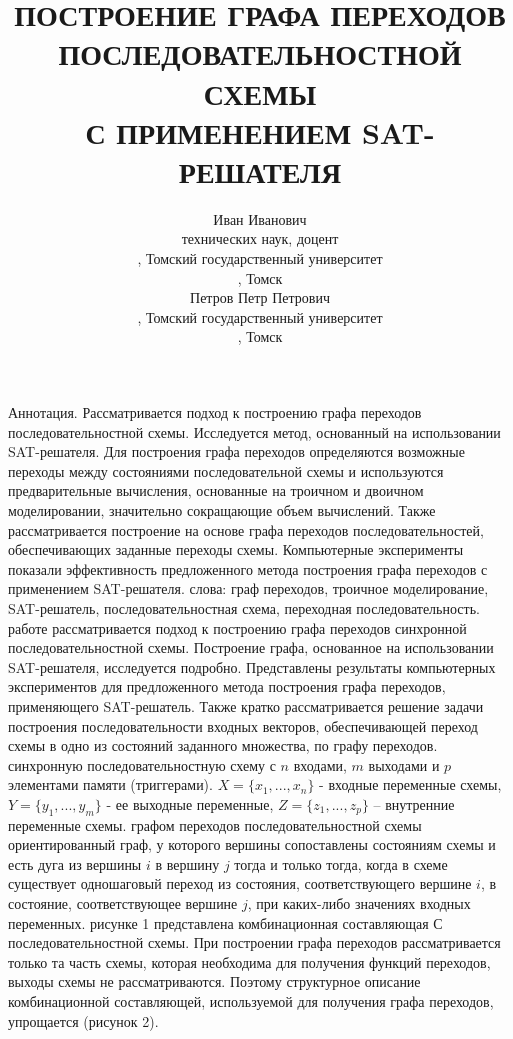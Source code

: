 \documentclass[13pt]{article}
\title{ПОСТРОЕНИЕ ГРАФА ПЕРЕХОДОВ ПОСЛЕДОВАТЕЛЬНОСТНОЙ СХЕМЫ\\ С ПРИМЕНЕНИЕМ SAT-РЕШАТЕЛЯ}
\author{\LARGEИванов Иван Иванович \\
\LARGEкандидат технических наук, доцент \\
\LARGEдоцент, Томский государственный университет \\
\LARGEРоссия, Томск \\ Петров Петр Петрович \\
\LARGEстудент, Томский государственный университет \\
\LARGEРоссия, Томск}
\begin{document}
\maketitle
\begin{Large}
Аннотация. Рассматривается подход к построению графа
переходов последовательностной схемы. Исследуется метод,
основанный на использовании SAT-решателя. Для построения графа
переходов определяются возможные переходы между состояниями
последовательной схемы и используются предварительные
вычисления, основанные на троичном и двоичном моделировании,
значительно сокращающие объем вычислений. Также
рассматривается построение на основе графа переходов
последовательностей, обеспечивающих заданные переходы схемы.
Компьютерные эксперименты показали эффективность
предложенного метода построения графа переходов с применением
SAT-решателя.
 слова: граф переходов, троичное моделирование,
SAT-решатель, последовательностная схема, переходная
последовательность.\\
 работе рассматривается подход к построению графа переходов
синхронной последовательностной схемы. Построение графа,
основанное на использовании SAT-решателя, исследуется подробно.
Представлены результаты компьютерных экспериментов для
предложенного метода построения графа переходов, применяющего
SAT-решатель. Также кратко рассматривается решение задачи
построения последовательности входных векторов, обеспечивающей
переход схемы в одно из состояний заданного множества, по графу
переходов. 
\newpage
{} синхронную последовательностную схему с $n$ 
входами, $m$ выходами и $p$ элементами памяти (триггерами).
$X = \{{x_1, ..., x_n}\} $ - входные переменные схемы, $Y = \{{y_1, ..., y_m}\}$ - ее
выходные переменные, $Z = \{{z_1, ..., z_p}\} $ – внутренние переменные
схемы.
 графом переходов последовательностной схемы
ориентированный граф, у которого вершины сопоставлены
состояниям схемы и есть дуга из вершины $i$ в вершину $j$ тогда и
только тогда, когда в схеме существует одношаговый переход из
состояния, соответствующего вершине $i$, в состояние,
соответствующее вершине $j$, при каких-либо значениях входных
переменных.
 рисунке 1 представлена комбинационная составляющая С
последовательностной схемы. При построении графа переходов
рассматривается только та часть схемы, которая необходима для
получения функций переходов, выходы схемы не рассматриваются.
Поэтому структурное описание комбинационной составляющей,
используемой для получения графа переходов, упрощается (рисунок
2).\\\end{Large}
\end{document}
